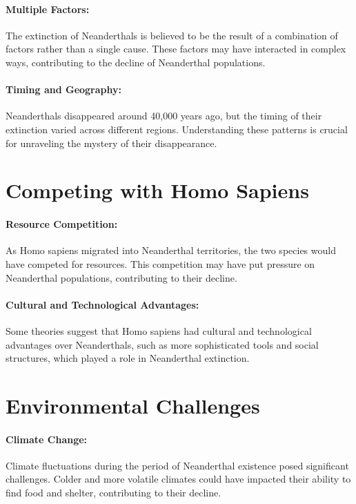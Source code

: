 \documentclass{book}
\begin{document}
\paragraph{Multiple Factors:}
The extinction of Neanderthals is believed to be the result of a combination of factors rather than a single cause. These factors may have interacted in complex ways, contributing to the decline of Neanderthal populations.

\paragraph{Timing and Geography:}
Neanderthals disappeared around 40,000 years ago, but the timing of their extinction varied across different regions. Understanding these patterns is crucial for unraveling the mystery of their disappearance.

\section*{Competing with Homo Sapiens}

\paragraph{Resource Competition:}
As Homo sapiens migrated into Neanderthal territories, the two species would have competed for resources. This competition may have put pressure on Neanderthal populations, contributing to their decline.

\paragraph{Cultural and Technological Advantages:}
Some theories suggest that Homo sapiens had cultural and technological advantages over Neanderthals, such as more sophisticated tools and social structures, which played a role in Neanderthal extinction.

\section*{Environmental Challenges}

\paragraph{Climate Change:}
Climate fluctuations during the period of Neanderthal existence posed significant challenges. Colder and more volatile climates could have impacted their ability to find food and shelter, contributing to their decline.
\end{document}
